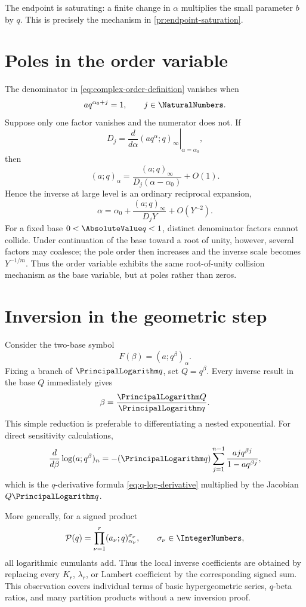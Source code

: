 \documentclass[11pt,a4paper,oneside,openany]{book}
\theoremstyle{definition}
\theoremstyle{remark}
\begin{document}
The endpoint is saturating: a finite change in \(\alpha\) multiplies the
small parameter \(b\) by \(q\).  This is precisely the mechanism in
\cref{pr:endpoint-saturation}.

\section{Poles in the order variable}

The denominator in \eqref{eq:complex-order-definition} vanishes when
\[
 aq^{\alpha_0+j}=1,
 \qquad j\in\NaturalNumbers.
\]
Suppose only one factor vanishes and the numerator does not.  If
\[
 D_j=\left.\frac{d}{d\alpha}(aq^\alpha;q)_\infty\right|_{\alpha=\alpha_0},
\]
then
\[
 (a;q)_\alpha=\frac{(a;q)_\infty}{D_j(\alpha-\alpha_0)}+O(1).
\]
Hence the inverse at large level is an ordinary reciprocal expansion,
\begin{equation}\label{eq:order-pole-inverse}
 \alpha=\alpha_0+\frac{(a;q)_\infty}{D_jY}+O(Y^{-2}).
\end{equation}
For a fixed base \(0<\AbsoluteValue q<1\), distinct denominator factors cannot
collide.  Under continuation of the base toward a root of unity, however,
several factors may coalesce; the pole order then increases and the inverse
scale becomes \(Y^{-1/m}\).  Thus the order variable exhibits the same
root-of-unity collision mechanism as the base variable, but at poles rather
than zeros.

\section{Inversion in the geometric step}

Consider the two-base symbol
\[
 F(\beta)=(a;q^\beta)_\alpha.
\]
Fixing a branch of \(\PrincipalLogarithm q\), set \(Q=q^\beta\).  Every inverse result in
the base \(Q\) immediately gives
\begin{equation}\label{eq:beta-reduction}
 \beta=\frac{\PrincipalLogarithm Q}{\PrincipalLogarithm q}.
\end{equation}
This simple reduction is preferable to differentiating a nested exponential.
For direct sensitivity calculations,
\[
 \frac{d}{d\beta}\log(a;q^\beta)_n
 =-(\PrincipalLogarithm q)\sum_{j=1}^{n-1}
 \frac{ajq^{\beta j}}{1-aq^{\beta j}},
\]
which is the \(q\)-derivative formula
\eqref{eq:q-log-derivative} multiplied by the Jacobian
\(Q\PrincipalLogarithm q\).

More generally, for a signed product
\[
 \mathcal P(q)=\prod_{\nu=1}^{r}(a_\nu;q)_{\alpha_\nu}^{\sigma_\nu},
 \qquad \sigma_\nu\in\IntegerNumbers,
\]
all logarithmic cumulants add.  Thus the local inverse coefficients are
obtained by replacing every \(K_r\), \(\lambda_r\), or Lambert coefficient
by the corresponding signed sum.  This observation covers individual terms
of basic hypergeometric series, \(q\)-beta ratios, and many partition
products without a new inversion proof.
\end{document}
